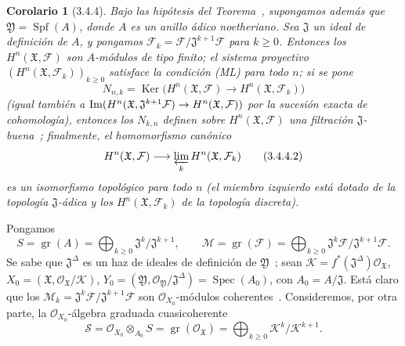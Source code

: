 \documentclass[10pt,oneside,openany]{book}
\theoremstyle{egaenv}\newtheorem*{env}{---}
\theoremstyle{egastatement}
\newtheorem*{corollary}{Corolario}
\theoremstyle{egadescription}
\renewcommand{\geq}{\geqslant}
\renewcommand{\to}{\mathchoice{\longrightarrow}{\rightarrow}{\rightarrow}{\rightarrow}}
\begin{document}
\begin{corollary}[3.4.4]
\label{III.3.4.4}
\label{III.3.4.4-fr}
Bajo las hipótesis del Teorema~, supongamos además que $\mathfrak Y=\operatorname{Spf}(A)$, donde $A$ es un anillo ádico noetheriano.
Sea $\mathfrak J$ un ideal de definición de $A$, y pongamos $\mathcal F_k=\mathcal F/\mathfrak J^{k+1}\mathcal F$ para $k\geq0$.
Entonces los $H^n(\mathfrak X,\mathcal F)$ son $A$-módulos de tipo finito; el sistema proyectivo $(H^n(\mathfrak X,\mathcal F_k))_{k\geq0}$ satisface la condición \emph{(ML)} para todo $n$; si se pone
\[
N_{n,k}=\operatorname{Ker}\bigl(H^n(\mathfrak X,\mathcal F)
\longrightarrow H^n(\mathfrak X,\mathcal F_k)\bigr)
\tag{3.4.4.1}\label{III.3.4.4.1-fr}
\]
(igual también a $\operatorname{Im}(H^n(\mathfrak X,\mathfrak J^{k+1}\mathcal F)
\to H^n(\mathfrak X,\mathcal F))$ por la sucesión exacta de cohomología), entonces los $N_{k,n}$ definen sobre $H^n(\mathfrak X,\mathcal F)$ una filtración $\mathfrak J$-buena~; finalmente, el homomorfismo canónico
\[
H^n(\mathfrak X,\mathcal F)
\longrightarrow\varprojlim_kH^n(\mathfrak X,\mathcal F_k)
\tag{3.4.4.2}\label{III.3.4.4.2-fr}
\]
es un isomorfismo topológico para todo $n$ (el miembro izquierdo está dotado de la topología $\mathfrak J$-ádica y los $H^n(\mathfrak X,\mathcal F_k)$ de la topología discreta).
\end{corollary}

Pongamos
\[
S=\operatorname{gr}(A)=\bigoplus_{k\geq0}
\mathfrak J^k/\mathfrak J^{k+1},\qquad
\mathcal M=\operatorname{gr}(\mathcal F)=\bigoplus_{k\geq0}
\mathfrak J^k\mathcal F/\mathfrak J^{k+1}\mathcal F.
\tag{3.4.4.3}\label{III.3.4.4.3-fr}
\]
Se sabe que $\mathfrak J^\Delta$ es un haz de ideales de definición de $\mathfrak Y$~; sean $\mathcal K=f^*(\mathfrak J^\Delta)\mathcal O_{\mathfrak X}$, $X_0=(\mathfrak X,\mathcal O_{\mathfrak X}/\mathcal K)$, $Y_0=(\mathfrak Y,\mathcal O_{\mathfrak Y}/\mathfrak J^\Delta)
=\operatorname{Spec}(A_0)$, con $A_0=A/\mathfrak J$.
Está claro que los $\mathcal M_k=\mathfrak J^k\mathcal F/\mathfrak J^{k+1}\mathcal F$ son $\mathcal O_{X_0}$-módulos coherentes~.
Consideremos, por otra parte, la $\mathcal O_{X_0}$-álgebra graduada cuasicoherente
\[
\mathcal S=\mathcal O_{X_0}\otimes_{A_0}S
=\operatorname{gr}(\mathcal O_{\mathfrak X})
=\bigoplus_{k\geq0}\mathcal K^k/\mathcal K^{k+1}.
\tag{3.4.4.4}\label{III.3.4.4.4-fr}
\]
\end{document}
